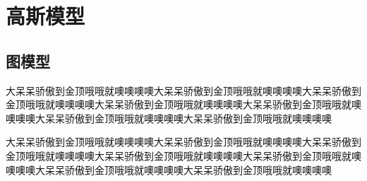 \chapter{高斯模型}
\section{图模型}
大呆呆骄傲到金顶哦哦就噢噢噢噢大呆呆骄傲到金顶哦哦就噢噢噢噢大呆呆骄傲到金顶哦哦就噢噢噢噢大呆呆骄傲到金顶哦哦就噢噢噢噢大呆呆骄傲到金顶哦哦就噢噢噢噢大呆呆骄傲到金顶哦哦就噢噢噢噢大呆呆骄傲到金顶哦哦就噢噢噢噢

大呆呆骄傲到金顶哦哦就噢噢噢噢大呆呆骄傲到金顶哦哦就噢噢噢噢大呆呆骄傲到金顶哦哦就噢噢噢噢大呆呆骄傲到金顶哦哦就噢噢噢噢大呆呆骄傲到金顶哦哦就噢噢噢噢大呆呆骄傲到金顶哦哦就噢噢噢噢大呆呆骄傲到金顶哦哦就噢噢噢噢